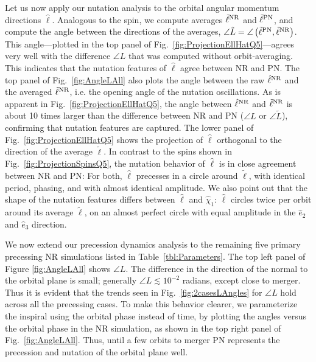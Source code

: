 \documentclass[aps,prd,amsmath,floatfix,twocolumn,superscriptaddress,nofootinbib,showpacs]{revtex4-1}
\newcommand{\ellHat}{\ensuremath{\hat{\ell}}}
\begin{document}
Let us now apply our nutation analysis to the orbital angular momentum
directions $\ellHat$.  Analogous to the spin, we compute averages
$\tilde\ell^{\rm NR}$ and $\tilde\ell^{\rm PN}$, and compute the angle
between the directions of the averages, $\angle\tilde
L=\angle\left(\tilde\ell^{\rm PN}, \tilde\ell^{\rm NR}\right)$.  This
angle---plotted in the top panel of
Fig.~\ref{fig:ProjectionEllHatQ5}---agrees very well with the
difference $\angle L$ that was computed without orbit-averaging.  This
indicates that the nutation features of $\hat\ell$ agree between NR
and PN.  The top panel of Fig.~\ref{fig:AngleLAll} also plots the
angle between the raw $\hat\ell^{\rm NR}$ and the averaged
$\tilde\ell^{\rm NR}$, i.e. the opening angle of the nutation
oscillations.  As is apparent in Fig.~\ref{fig:ProjectionEllHatQ5},
the angle between $\hat\ell^{\rm NR}$ and $\tilde\ell^{\rm NR}$ is
about 10 times larger than the difference between NR and PN ($\angle
L$ or $\angle \tilde L$), confirming that
nutation features are captured.  The lower panel of
Fig.~\ref{fig:ProjectionEllHatQ5} shows the projection of $\hat\ell$
orthogonal to the direction of the average $\tilde\ell$.  In contrast
to the spins shown in Fig.~\ref{fig:ProjectionSpinsQ5}, the nutation
behavior of $\ellHat$ is in close agreement between NR and PN: For
both, $\ellHat$ precesses in a circle around $\tilde\ell$, with
identical period, phasing, and with almost identical amplitude.  We
also point out that the shape of the nutation features differs between
$\ellHat$ and $\hat{\chi}_{1}$: $\ellHat$ circles twice per orbit
around its average $\tilde\ell$, on an almost perfect circle with
equal amplitude in the $\hat e_2$ and $\hat e_3$ direction.


We now extend our precession dynamics analysis to the remaining five
primary precessing NR simulations listed in
Table~\ref{tbl:Parameters}. The top left panel of Figure
\ref{fig:AngleLAll} shows $\angle L$.  The difference in the direction
of the normal to the orbital plane is small; generally $\angle
L\lesssim 10^{-2}$ radians, except close to merger. Thus it is evident
that the trends seen in Fig.~\ref{fig:2casesLAngles} for $\angle L$
hold across all the precessing cases. To make this behavior clearer,
we parameterize the inspiral using the orbital phase instead of time,
by plotting the angles versus the orbital phase in the NR simulation,
as shown in the top right panel of Fig.~\ref{fig:AngleLAll}.
Thus, until a few orbits to merger PN represents the precession and
nutation of the orbital plane well.
\end{document}
